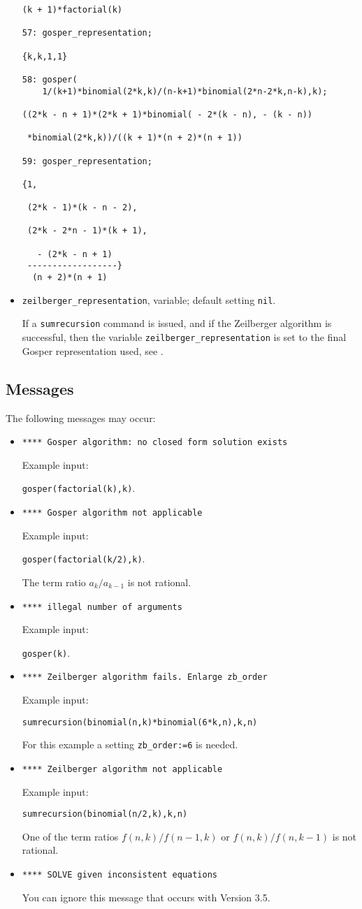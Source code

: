 \begin{itemize}
{\begin{verbatim}
(k + 1)*factorial(k)

57: gosper_representation;

{k,k,1,1}

58: gosper(
    1/(k+1)*binomial(2*k,k)/(n-k+1)*binomial(2*n-2*k,n-k),k);

((2*k - n + 1)*(2*k + 1)*binomial( - 2*(k - n), - (k - n))

 *binomial(2*k,k))/((k + 1)*(n + 2)*(n + 1))

59: gosper_representation;

{1,

 (2*k - 1)*(k - n - 2),

 (2*k - 2*n - 1)*(k + 1),

   - (2*k - n + 1)
 ------------------}
  (n + 2)*(n + 1)
\end{verbatim}
}\noindent
\item
{\tt zeilberger\_representation}, variable; default setting {\tt nil}.

If a {\tt sumrecursion} command is issued, and if the Zeilberger
algorithm is successful, then the variable
{\tt zeilberger\_representation} is set to the final Gosper
representation used, see \cite{Koornwinder:93}.
\end{itemize}

\subsection{Messages}

The following messages may occur:
\begin{itemize}
\item
{\tt ***** Gosper algorithm:\ no closed form solution exists}

Example input:

{\tt gosper(factorial(k),k)}.
\item
{\tt ***** Gosper algorithm not applicable}

Example input:

{\tt gosper(factorial(k/2),k)}.

The term ratio $a_k/a_{k-1}$ is not rational.
\item
{\tt ***** illegal number of arguments}

Example input:

{\tt gosper(k)}.
\item
{\tt ***** Zeilberger algorithm fails.\ Enlarge zb\_order}

Example input:

{\tt sumrecursion(binomial(n,k)*binomial(6*k,n),k,n)}

For  this example a setting {\tt zb\_order:=6} is needed.
\item
{\tt ***** Zeilberger algorithm not applicable}

Example input:

{\tt sumrecursion(binomial(n/2,k),k,n)}

One of the term ratios $f(n,k)/f(n-1,k)$ or $f(n,k)/f(n,k-1)$
is not rational.
\item
{\tt ***** SOLVE given inconsistent equations}

You can ignore this message that occurs with Version 3.5.
\end{itemize}
